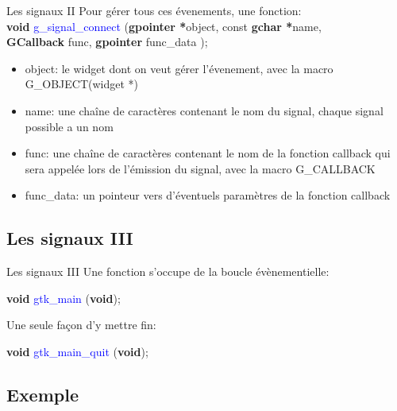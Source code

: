 \documentclass{beamer}
\begin{document}
\begin{frame}{Les signaux II}
    Pour gérer tous ces évenements, une fonction:\\
    \vspace{0.1cm}
    \textbf{void} \textcolor{blue}{g\_signal\_connect} (\textbf{gpointer *}object, const \textbf{gchar *}name,\\
    \hspace{4cm}\textbf{GCallback} func, \textbf{gpointer} func\_data );\\
    \vspace{0.3 cm}
    \begin{itemize}
        \item object: le widget dont on veut gérer l'évenement, avec la macro G\_OBJECT(widget *) 
        \item name: une chaîne de caractères contenant le nom du signal, chaque signal possible a un nom
        \item func: une chaîne de caractères contenant le nom de la fonction callback qui sera appelée lors de l'émission du signal, avec la macro G\_CALLBACK
        \item func\_data: un pointeur vers d'éventuels paramètres de la fonction callback
    \end{itemize}
\end{frame}

\subsection{Les signaux III}

\begin{frame}{Les signaux III}
    Une fonction s'occupe de la boucle évènementielle:\\
    \begin{center}
        \textbf{void} \textcolor{blue}{gtk\_main} (\textbf{void});
    \end{center}
    Une seule façon d'y mettre fin:\\
    \begin{center}
        \textbf{void} \textcolor{blue}{gtk\_main\_quit} (\textbf{void});
    \end{center}
\end{frame}

\subsection{Exemple}
\end{document}
